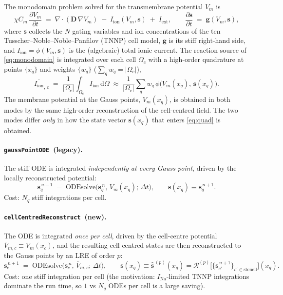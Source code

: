 \documentclass[11pt,a4paper]{article}
\newcommand{\Vm}{V_{m}}
\newcommand{\Iion}{I_{\text{ion}}}
\newcommand{\Iext}{I_{\text{ext}}}
\newcommand{\Dten}{\mathbf{D}}
\newcommand{\grad}{\nabla}
\newcommand{\divg}{\nabla\!\cdot}
\newcommand{\code}[1]{\texttt{\small #1}}
\newcommand{\gpode}{\code{gaussPointODE}}
\newcommand{\ccrec}{\code{cellCentredReconstruct}}
\newcommand{\states}{\mathbf{s}}
\newcommand{\Vbarc}{\overline{V}_{m,c}}
\newcommand{\Omegac}{\Omega_{c}}
\begin{document}
The monodomain problem solved for the transmembrane potential $\Vm$ is
\begin{equation}
  \chi C_m \,\frac{\partial \Vm}{\partial t}
  \;=\; \divg\!\left(\Dten\,\grad \Vm\right)
        \;-\; \Iion(\Vm,\states) \;+\; \Iext ,
  \qquad
  \frac{\partial \states}{\partial t} \;=\; \mathbf{g}(\Vm,\states),
  \label{eq:monodomain}
\end{equation}
where $\states$ collects the $N$ gating variables and ion concentrations of the
ten Tusscher--Noble--Noble--Panfilov (TNNP) cell model, $\mathbf{g}$ is its stiff
right-hand side, and $\Iion=\phi(\Vm,\states)$ is the (algebraic) total ionic
current. The reaction source of \eqref{eq:monodomain} is integrated over each
cell $\Omegac$ with a high-order quadrature at points $\{x_q\}$ and weights
$\{w_q\}$ ($\sum_q w_q=|\Omegac|$),
\begin{equation}
  \overline{\Iion}_{,\,c}
  \;=\; \frac{1}{|\Omegac|}\int_{\Omegac} \Iion \,\mathrm{d}\Omega
  \;\approx\; \frac{1}{|\Omegac|}\sum_{q} w_q\,\phi\!\big(\Vm(x_q),\,\states(x_q)\big).
  \label{eq:quad}
\end{equation}
The membrane potential at the Gauss points, $\Vm(x_q)$, is obtained in both modes
by the same high-order reconstruction of the cell-centred field. The two modes
differ \emph{only} in how the state vector $\states(x_q)$ that enters
\eqref{eq:quad} is obtained.

\paragraph{\gpode\ (legacy).}
The stiff ODE is integrated \emph{independently at every Gauss point}, driven by
the locally reconstructed potential:
\begin{equation}
  \states_q^{\,n+1}
  \;=\; \mathrm{ODEsolve}\!\big(\states_q^{\,n},\,\Vm(x_q);\,\Delta t\big),
  \qquad
  \states(x_q) \equiv \states_q^{\,n+1}.
  \label{eq:gp}
\end{equation}
Cost: $N_q$ stiff integrations per cell.

\paragraph{\ccrec\ (new).}
The ODE is integrated \emph{once per cell}, driven by the cell-centre potential
$\Vbarc \equiv \Vm(x_c)$, and the resulting cell-centred states are then
reconstructed to the Gauss points by an LRE of order $p$:
\begin{equation}
  \states_c^{\,n+1}
  \;=\; \mathrm{ODEsolve}\!\big(\states_c^{\,n},\,\Vbarc;\,\Delta t\big),
  \qquad
  \states(x_q) \equiv \widehat{\states}^{\,(p)}(x_q)
        = \mathcal{R}^{(p)}\!\big[\{\states_{c'}^{\,n+1}\}_{c'\in\text{stencil}}\big](x_q).
  \label{eq:cc}
\end{equation}
Cost: one stiff integration per cell (the motivation: $I_{\mathrm{Na}}$-limited
TNNP integrations dominate the run time, so $1$ vs $N_q$ ODEs per cell is a large
saving).
\end{document}
